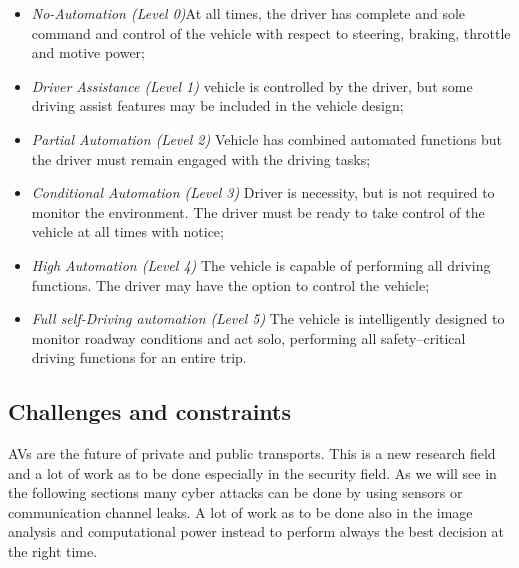     \begin{itemize}
        \item \textit{No-Automation (Level 0)}At all times, the driver has complete and sole command and control of the vehicle with respect to steering, braking, throttle and motive power;

        \item \textit{Driver Assistance (Level 1)} vehicle is controlled by the driver, but some driving assist features may be included in the vehicle design;
        
        \item \textit{Partial Automation (Level 2)} Vehicle has combined automated functions but the driver must remain engaged with the driving tasks;

        
        \item \textit{Conditional Automation (Level 3)} Driver is necessity, but is not required to monitor the environment. The driver must be ready to take control of the vehicle at all times with notice;

        
        \item \textit{High Automation (Level 4)} The vehicle is capable of performing all driving functions. The driver may have the option to control the vehicle;
        
        \item \textit{Full self-Driving automation (Level 5)} The vehicle is intelligently designed to monitor roadway conditions and act solo, performing all safety–critical driving functions for an entire trip.

    \end{itemize}

\subsection{Challenges and constraints}
    AVs are the future of private and public transports. This is a new research field and a lot of work as to be done especially in the security field. As we will see in the following sections many cyber attacks can be done by using sensors or communication channel leaks. 
    A lot of work as to be done also in the image analysis and computational power instead to perform always the best decision at the right time.
